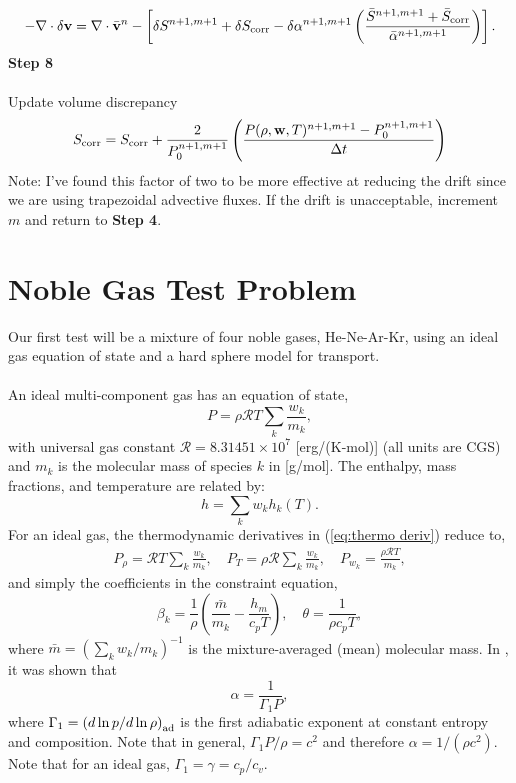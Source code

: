 \documentclass[final]{siamltex}
\def\vb {{\bf v}}
\def\wb {{\bf w}}
\begin{document}
\begin{equation}
-\nabla\cdot\delta\vb = \nabla\cdot\bar{\vb}^n - \left[\delta S^{n+1,m+1} + \delta S_{\rm corr} - \delta\alpha^{n+1,m+1}\left(\frac{\bar{S}^{n+1,m+1} + \bar{S}_{\rm corr}}{\bar{\alpha}^{n+1,m+1}}\right)\right].
\end{equation}
{\bf Step 8}\\ \\
Update volume discrepancy
\begin{equation}
S_{\rm corr} = S_{\rm corr} + \frac{2}{P_0^{n+1,m+1}}\left(\frac{P(\rho,\wb,T)^{n+1,m+1} - P_0^{n+1,m+1}}{\Delta t}\right)
\end{equation}
Note: I've found this factor of two to be more effective at reducing the drift
since we are using trapezoidal advective fluxes.  If the drift is unacceptable,
increment $m$ and return to {\bf Step 4}.

\section{Noble Gas Test Problem}
Our first test will be a mixture of four noble gases, He-Ne-Ar-Kr,
using an ideal gas equation of state and a hard sphere model for transport.\\ \\
An ideal multi-component gas has an equation of state,
\begin{equation}
P = \rho\mathcal{R}T\sum_k\frac{w_k}{m_k},
\end{equation}
with universal gas constant $\mathcal{R} = 8.31451\times 10^7$ [erg/(K-mol)] 
(all units are CGS) and $m_k$ is the molecular mass of species $k$ in [g/mol].
The enthalpy, mass fractions, and temperature are related by:
\begin{equation}
h = \sum_k w_k h_k(T).
\end{equation}
For an ideal gas, the thermodynamic derivatives in (\ref{eq:thermo deriv})
reduce to,
\begin{eqnarray}
P_\rho = \mathcal{R} T\sum_k\frac{w_k}{m_k}, \quad
P_T = \rho\mathcal{R}\sum_k\frac{w_k}{m_k}, \quad
P_{w_k} = \frac{\rho\mathcal{R}T}{m_k},
\end{eqnarray}
and simply the coefficients in the constraint equation,
\begin{equation}
\beta_k = \frac{1}{\rho}\left(\frac{\bar{m}}{m_k} - \frac{h_m}{c_p T}\right), \quad
\theta = \frac{1}{\rho c_p T},
\end{equation}
where $\bar{m} = (\sum_k w_k/m_k)^{-1}$ is the mixture-averaged (mean) molecular mass.
In \cite{MAESTROI}, it was shown that
\begin{equation}
\alpha = \frac{1}{\Gamma_1 P},
\end{equation}
where $\Gamma_1 = \left(d\ln{p}/d\ln{\rho}\right)_{\rm ad}$ is the first adiabatic exponent
at constant entropy and composition.  Note that in general, $\Gamma_1 P/\rho = c^2$ and
therefore $\alpha = 1/(\rho c^2)$.
Note that for an ideal gas, $\Gamma_1 = \gamma = c_p/c_v$.
\end{document}
